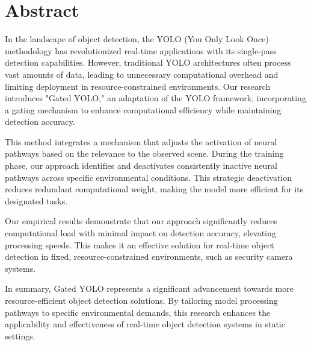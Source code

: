 \section*{Abstract} 						%

In the landscape of object detection, the YOLO (You Only Look Once) methodology has revolutionized real-time applications with its single-pass detection capabilities. However, traditional YOLO architectures often process vast amounts of data, leading to unnecessary computational overhead and limiting deployment in resource-constrained environments. Our research introduces "Gated YOLO," an adaptation of the YOLO framework, incorporating a gating mechanism to enhance computational efficiency while maintaining detection accuracy.

This method integrates a mechanism that adjusts the activation of neural pathways based on the relevance to the observed scene. During the training phase, our approach identifies and deactivates consistently inactive neural pathways across specific environmental conditions. This strategic deactivation reduces redundant computational weight, making the model more efficient for its designated tasks.

Our empirical results demonstrate that our approach significantly reduces computational load with minimal impact on detection accuracy, elevating processing speeds. This makes it an effective solution for real-time object detection in fixed, resource-constrained environments, such as security camera systems.

In summary, Gated YOLO represents a significant advancement towards more resource-efficient object detection solutions. By tailoring model processing pathways to specific environmental demands, this research enhances the applicability and effectiveness of real-time object detection systems in static settings.

\clearpage
